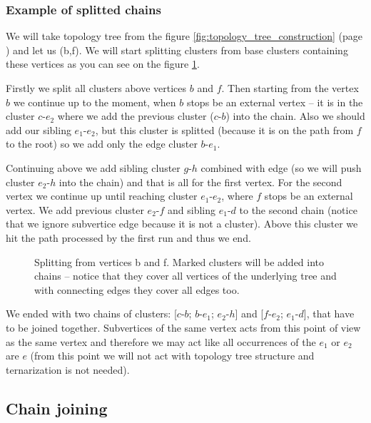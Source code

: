 \subsubsection{Example of splitted chains}

We will take topology tree from the figure \ref{fig:topology_tree_construction}
(page \pageref{fig:topology_tree_construction}) and let us \Expose(b,f). We will
start splitting clusters from base clusters containing these vertices as you
can see on the figure \ref{fig:chain_clusters_example}.

Firstly we split all clusters above vertices $b$ and $f$. Then starting from the
vertex $b$ we continue up to the moment, when $b$ stops be an external vertex
-- it is in the cluster $c$-$e_2$ where we add the previous cluster ($c$-$b$)
into the chain. Also we should add our sibling $e_1$-$e_2$, but this cluster is
splitted (because it is on the path from $f$ to the root) so we add only the
edge cluster $b$-$e_1$.

Continuing above we add sibling cluster $g$-$h$ combined with edge (so we will
push cluster $e_2$-$h$ into the chain) and that is all for the first vertex.
For the second vertex we continue up until reaching cluster $e_1$-$e_2$, where
$f$ stops be an external vertex. We add previous cluster $e_2$-$f$ and sibling
$e_1$-$d$ to the second chain (notice that we ignore subvertice edge because it
is not a cluster). Above this cluster we hit the path processed by the first run
and thus we end.

\begin{figure}[h]
\centering
{}
\caption{Splitting from vertices b and f. Marked clusters will be added into
chains -- notice that they cover all vertices of the underlying tree and with
connecting edges they cover all edges too.}
\label{fig:chain_clusters_example}
\end{figure}

We ended with two chains of clusters: [$c$-$b$; $b$-$e_1$; $e_2$-$h$] and
[$f$-$e_2$; $e_1$-$d$], that have to be joined together. Subvertices
of the same vertex acts from this point of view as the same vertex and therefore
we may act like all occurrences of the $e_1$ or $e_2$ are $e$ (from this point
we will not act with topology tree structure and ternarization is not needed).

\subsection{Chain joining}

